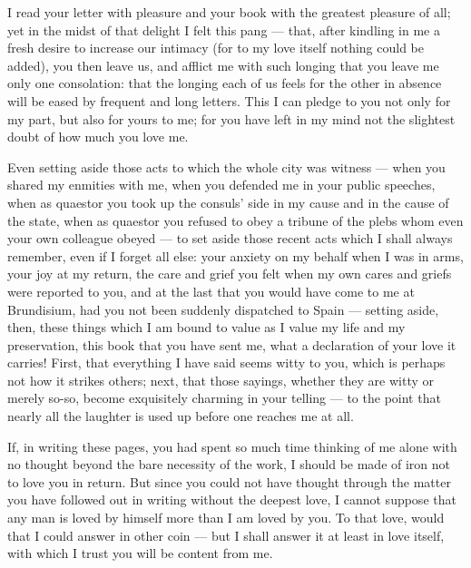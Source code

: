 

 I read your letter with pleasure and your book with the greatest pleasure of all; yet in the midst of that delight I felt this pang --- that, after kindling in me a fresh desire to increase our intimacy (for to my love itself nothing could be added), you then leave us, and afflict me with such longing that you leave me only one consolation: that the longing each of us feels for the other in absence will be eased by frequent and long letters. This I can pledge to you not only for my part, but also for yours to me; for you have left in my mind not the slightest doubt of how much you love me.

 Even setting aside those acts to which the whole city was witness --- when you shared my enmities with me, when you defended me in your public speeches, when as quaestor you took up the consuls' side in my cause and in the cause of the state, when as quaestor you refused to obey a tribune of the plebs whom even your own colleague obeyed --- to set aside those recent acts which I shall always remember, even if I forget all else: your anxiety on my behalf when I was in arms, your joy at my return, the care and grief you felt when my own cares and griefs were reported to you, and at the last that you would have come to me at Brundisium, had you not been suddenly dispatched to Spain --- setting aside, then, these things which I am bound to value as I value my life and my preservation, this book that you have sent me, what a declaration of your love it carries! First, that everything I have said seems witty to you, which is perhaps not how it strikes others; next, that those sayings, whether they are witty or merely so-so, become exquisitely charming in your telling --- to the point that nearly all the laughter is used up before one reaches me at all.

 If, in writing these pages, you had spent so much time thinking of me alone with no thought beyond the bare necessity of the work, I should be made of iron not to love you in return. But since you could not have thought through the matter you have followed out in writing without the deepest love, I cannot suppose that any man is loved by himself more than I am loved by you. To that love, would that I could answer in other coin --- but I shall answer it at least in love itself, with which I trust you will be content from me.

